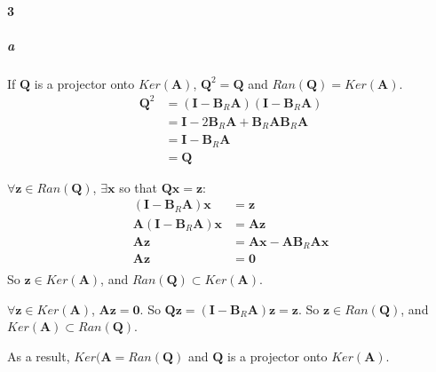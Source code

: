 \documentclass[22pt]{article}
\begin{document}
	\paragraph{3}
		\subparagraph{a} If $\mathbf{Q}$ is a projector onto $Ker(\mathbf{A})$, $\mathbf{Q}^2 = \mathbf{Q}$ and $Ran(\mathbf{Q}) = Ker(\mathbf{A})$.
		\begin{align}
			\mathbf{Q}^2 &= (\mathbf{I}-\mathbf{B}_R\mathbf{A})(\mathbf{I}-\mathbf{B}_R\mathbf{A})\\
			& = \mathbf{I} - 2\mathbf{B}_R\mathbf{A} + \mathbf{B}_R\mathbf{A}\mathbf{B}_R\mathbf{A}\\
			& = \mathbf{I} - \mathbf{B}_R\mathbf{A}\\
			& = \mathbf{Q}
		\end{align}

		$\forall \mathbf{z} \in Ran(\mathbf{Q})$, $\exists \mathbf{x}$ so that $\mathbf{Qx=z}$:
		\begin{align}
			(\mathbf{I} - \mathbf{B}_R\mathbf{A})\mathbf{x} & = \mathbf{z} \\
			\mathbf{A}(\mathbf{I} - \mathbf{B}_R\mathbf{A})\mathbf{x} & = \mathbf{Az} \\
			\mathbf{Az} & = \mathbf{Ax} - \mathbf{AB}_R\mathbf{Ax}\\
			\mathbf{Az} & = \mathbf{0}\\
		\end{align}
		So $\mathbf{z} \in Ker(\mathbf{A})$, and $Ran(\mathbf{Q}) \subset Ker(\mathbf{A})$.

		$\forall \mathbf{z} \in Ker(\mathbf{A})$, $\mathbf{Az=0}$. So $\mathbf{Qz} = (\mathbf{I} - \mathbf{B}_R\mathbf{A})\mathbf{z} = \mathbf{z}$. So $\mathbf{z} \in Ran(\mathbf{Q})$, and $Ker(\mathbf{A} )\subset Ran(\mathbf{Q})$.

		As a result, $Ker(\mathbf{A} = Ran(\mathbf{Q})$ and $\mathbf{Q}$ is a projector onto $Ker(\mathbf{A})$.
\end{document}
